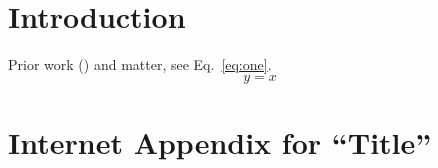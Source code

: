 \documentclass[a4paper, 11pt]{article}
\begin{document}
\onehalfspacing
\section{Introduction}
Prior work (\citep{kamstra2003winter,kamstra2015seasonal}) and \cite{kamstra2015seasonal} matter, see Eq.~\ref{eq:one}.
\begin{equation}\label{eq:one} y = x \end{equation}
\clearpage
\appendix
\section*{\Large Internet Appendix for ``Title''}
\end{document}
